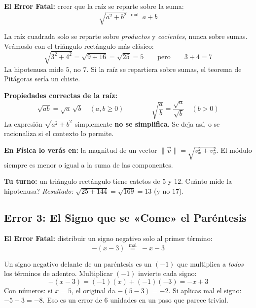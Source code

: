 \documentclass[12pt, letterpaper]{article}
\begin{document}
\begin{cuadroadvertencia}
  \textbf{El Error Fatal:} creer que la raíz se reparte sobre la suma:
  \[
    \sqrt{a^2 + b^2} \;\overset{\text{mal}}{=}\; a + b
  \]
\end{cuadroadvertencia}

La raíz cuadrada solo se reparte sobre \emph{productos} y \emph{cocientes}, nunca sobre sumas. Veámoslo con el triángulo rectángulo más clásico:
\[
  \sqrt{3^2 + 4^2} = \sqrt{9 + 16} = \sqrt{25} = 5 \qquad\text{pero}\qquad 3 + 4 = 7
\]
La hipotenusa mide $5$, no $7$. Si la raíz se repartiera sobre sumas, el teorema de Pitágoras sería un chiste.

\begin{cuadrosolucion}
  \textbf{Propiedades correctas de la raíz:}
  \[
    \sqrt{ab} = \sqrt{a}\,\sqrt{b} \quad (a, b \geq 0) \qquad\qquad
    \sqrt{\frac{a}{b}} = \frac{\sqrt{a}}{\sqrt{b}} \quad (b > 0)
  \]
  La expresión $\sqrt{a^2 + b^2}$ simplemente \textbf{no se simplifica}. Se deja así, o se racionaliza si el contexto lo permite.
\end{cuadrosolucion}

\noindent\textbf{En Física lo verás en:} la magnitud de un vector $\|\vec{v}\| = \sqrt{v_x^2 + v_y^2}$. El módulo siempre es menor o igual a la suma de las componentes.

\noindent\textbf{Tu turno:} un triángulo rectángulo tiene catetos de $5$ y $12$. \textquestiondown Cuánto mide la hipotenusa? \emph{Resultado:} $\sqrt{25 + 144} = \sqrt{169} = 13$ (y no $17$).

\subsection{Error 3: El Signo que se «Come» el Paréntesis}

\begin{cuadroadvertencia}
  \textbf{El Error Fatal:} distribuir un signo negativo solo al primer término:
  \[
    -(x - 3) \;\overset{\text{mal}}{=}\; -x - 3
  \]
\end{cuadroadvertencia}

Un signo negativo delante de un paréntesis es un $(-1)$ que multiplica a \emph{todos} los términos de adentro. Multiplicar $(-1)$ invierte cada signo:
\[
  -(x - 3) = (-1)(x) + (-1)(-3) = -x + 3
\]
Con números: si $x = 5$, el original da $-(5-3) = -2$. Si aplicas mal el signo: $-5 - 3 = -8$. Eso es un error de $6$ unidades en un paso que parece trivial.
\end{document}
